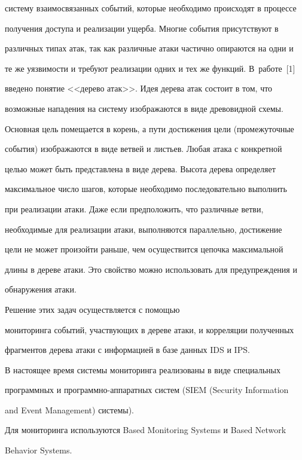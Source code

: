 сис\-те\-му взаимосвязанных событий, которые необходимо происходят в процессе 

получения доступа и реализации ущерба. Многие события присутствуют в 

различных типах атак, так как различные атаки частично опираются на одни и 

те же уязвимости и требуют реализации одних и тех же функций. В~работе~[1] 

введено понятие <<дерево атак>>. Идея дерева атак состоит в том, что 

возможные нападения на систему изображаются в виде древовидной схемы. 

Основная цель помещается в корень, а пути достижения цели (промежуточные 

события) изображаются в виде ветвей и листьев. Любая атака с конкретной 

целью может быть представлена в виде дерева. Высота дерева определяет 

максимальное число шагов, которые необходимо последовательно выполнить 

при реализации атаки. Даже если предположить, что различные ветви, 

необходимые для реализации атаки, выполняются параллельно, достижение 

цели не может произойти раньше, чем осуществится цепочка максимальной 

длины в дереве атаки. Это свойство можно использовать для предупреждения и 

обнаружения атаки. 



Решение этих задач осуществляется с помощью 

мониторинга событий, участвующих в дереве атаки, и корреляции полученных 

фрагментов дерева атаки с информацией в базе данных IDS и IPS. 

    

    В настоящее время системы мониторинга реализованы в виде специальных 

программных и про\-грам\-мно-ап\-па\-рат\-ных сис\-тем (SIEM (Security Information

and Event Management) сис\-те\-мы). 

Для мониторинга используются Based Monitoring Systems и Based Network 

Behavior Systems. 



    



